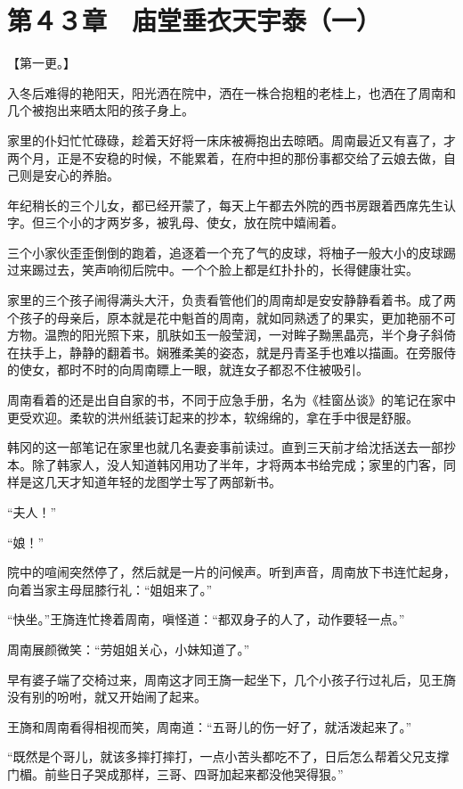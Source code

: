 \section{第４３章　庙堂垂衣天宇泰（一）}

【第一更。】

入冬后难得的艳阳天，阳光洒在院中，洒在一株合抱粗的老桂上，也洒在了周南和几个被抱出来晒太阳的孩子身上。

家里的仆妇忙忙碌碌，趁着天好将一床床被褥抱出去晾晒。周南最近又有喜了，才两个月，正是不安稳的时候，不能累着，在府中担的那份事都交给了云娘去做，自己则是安心的养胎。

年纪稍长的三个儿女，都已经开蒙了，每天上午都去外院的西书房跟着西席先生认字。但三个小的才两岁多，被乳母、使女，放在院中嬉闹着。

三个小家伙歪歪倒倒的跑着，追逐着一个充了气的皮球，将柚子一般大小的皮球踢过来踢过去，笑声响彻后院中。一个个脸上都是红扑扑的，长得健康壮实。

家里的三个孩子闹得满头大汗，负责看管他们的周南却是安安静静看着书。成了两个孩子的母亲后，原本就是花中魁首的周南，就如同熟透了的果实，更加艳丽不可方物。温煦的阳光照下来，肌肤如玉一般莹润，一对眸子黝黑晶亮，半个身子斜倚在扶手上，静静的翻着书。娴雅柔美的姿态，就是丹青圣手也难以描画。在旁服侍的使女，都时不时的向周南瞟上一眼，就连女子都忍不住被吸引。

周南看着的还是出自自家的书，不同于应急手册，名为《桂窗丛谈》的笔记在家中更受欢迎。柔软的洪州纸装订起来的抄本，软绵绵的，拿在手中很是舒服。

韩冈的这一部笔记在家里也就几名妻妾事前读过。直到三天前才给沈括送去一部抄本。除了韩家人，没人知道韩冈用功了半年，才将两本书给完成；家里的门客，同样是这几天才知道年轻的龙图学士写了两部新书。

“夫人！”

“娘！”

院中的喧闹突然停了，然后就是一片的问候声。听到声音，周南放下书连忙起身，向着当家主母屈膝行礼：“姐姐来了。”

“快坐。”王旖连忙搀着周南，嗔怪道：“都双身子的人了，动作要轻一点。”

周南展颜微笑：“劳姐姐关心，小妹知道了。”

早有婆子端了交椅过来，周南这才同王旖一起坐下，几个小孩子行过礼后，见王旖没有别的吩咐，就又开始闹了起来。

王旖和周南看得相视而笑，周南道：“五哥儿的伤一好了，就活泼起来了。”

“既然是个哥儿，就该多摔打摔打，一点小苦头都吃不了，日后怎么帮着父兄支撑门楣。前些日子哭成那样，三哥、四哥加起来都没他哭得狠。”

